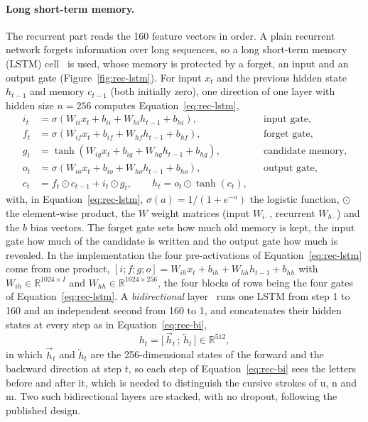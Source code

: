 \paragraph{Long short-term memory.}
The recurrent part reads the 160 feature vectors in order. A plain recurrent network forgets information over long sequences, so a long short-term memory (LSTM) cell~\cite{hochreiter1997} is used, whose memory is protected by a forget, an input and an output gate (Figure~\ref{fig:rec-lstm}).
For input $x_t$ and the previous hidden state $h_{t-1}$ and memory $c_{t-1}$ (both initially zero), one direction of one layer with hidden size $n=256$ computes Equation~\ref{eq:rec-lstm},
\begin{equation}
\begin{aligned}
i_t&=\sigma(W_{ii}x_t+b_{ii}+W_{hi}h_{t-1}+b_{hi}), &&\text{input gate,}\\
f_t&=\sigma(W_{if}x_t+b_{if}+W_{hf}h_{t-1}+b_{hf}), &&\text{forget gate,}\\
g_t&=\tanh(W_{ig}x_t+b_{ig}+W_{hg}h_{t-1}+b_{hg}), &&\text{candidate memory,}\\
o_t&=\sigma(W_{io}x_t+b_{io}+W_{ho}h_{t-1}+b_{ho}), &&\text{output gate,}\\
c_t&=f_t\odot c_{t-1}+i_t\odot g_t,\qquad h_t=o_t\odot\tanh(c_t),
\end{aligned}
\label{eq:rec-lstm}
\end{equation}
with, in Equation~\ref{eq:rec-lstm}, $\sigma(a)=1/(1+e^{-a})$ the logistic function, $\odot$ the element-wise product, the $W$ weight matrices (input $W_{i\cdot}$, recurrent $W_{h\cdot}$) and the $b$ bias vectors.
The forget gate sets how much old memory is kept, the input gate how much of the candidate is written and the output gate how much is revealed.
In the implementation the four pre-activations of Equation~\ref{eq:rec-lstm} come from one product, $[i;f;g;o]=W_{ih}x_t+b_{ih}+W_{hh}h_{t-1}+b_{hh}$ with $W_{ih}\in\mathbb R^{1024\times I}$ and $W_{hh}\in\mathbb R^{1024\times256}$, the four blocks of rows being the four gates of Equation~\ref{eq:rec-lstm}.
A \emph{bidirectional} layer~\cite{schuster1997} runs one LSTM from step 1 to 160 and an independent second from 160 to 1, and concatenates their hidden states at every step as in Equation~\ref{eq:rec-bi},
\begin{equation}
h_t=\bigl[\,\overrightarrow{h}_t\,;\,\overleftarrow{h}_t\,\bigr]\in\mathbb R^{512},
\label{eq:rec-bi}
\end{equation}
in which $\overrightarrow{h}_t$ and $\overleftarrow{h}_t$ are the 256-dimensional states of the forward and the backward direction at step $t$, so each step of Equation~\ref{eq:rec-bi} sees the letters before and after it, which is needed to distinguish the cursive strokes of u, n and m.
Two such bidirectional layers are stacked, with no dropout, following the published design.

